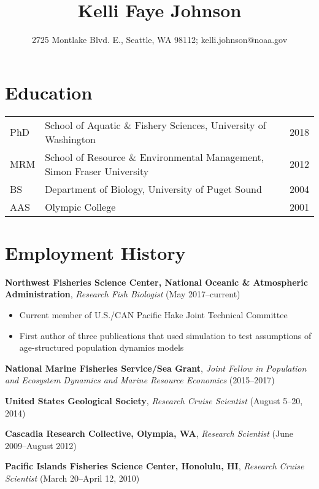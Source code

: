 \documentclass[10pt]{article}
\title{\bfseries\Large Kelli Faye Johnson}
\author{2725 Montlake Blvd. E., Seattle, WA 98112; kelli.johnson@noaa.gov}
\date{}
\begin{document}

\maketitle
\vspace{-15mm}
\noindent\makebox[\linewidth]{\rule{\paperwidth}{0.4pt}}

\section*{Education}
\begin{tabular}{lll}
PhD & School of Aquatic \& Fishery Sciences, University of Washington & 2018 \\
MRM & School of Resource \& Environmental Management, Simon Fraser University & 2012 \\
BS & Department of Biology, University of Puget Sound & 2004 \\
AAS & Olympic College & 2001 \\
\end{tabular}

\section*{Employment History}

\textbf{Northwest Fisheries Science Center, National Oceanic \& Atmospheric Administration}, \textit{Research Fish Biologist} (May 2017--current)
\begin{itemize}
\vspace{-2.5mm}
  \item Current member of U.S./CAN Pacific Hake Joint Technical Committee
  \item First author of three publications that used simulation to test assumptions of age-structured population dynamics models
\end{itemize}

\noindent \textbf{National Marine Fisheries Service/Sea Grant}, \textit{Joint Fellow in Population and Ecosystem Dynamics and Marine Resource Economics} (2015--2017)

\noindent \textbf{United States Geological Society}, \textit{Research Cruise Scientist} (August 5--20, 2014)

\noindent \textbf{Cascadia Research Collective, Olympia, WA}, \textit{Research Scientist} (June 2009--August 2012)

\noindent \textbf{Pacific Islands Fisheries Science Center, Honolulu, HI}, \textit{Research Cruise Scientist} (March 20--April 12, 2010)
\end{document}
